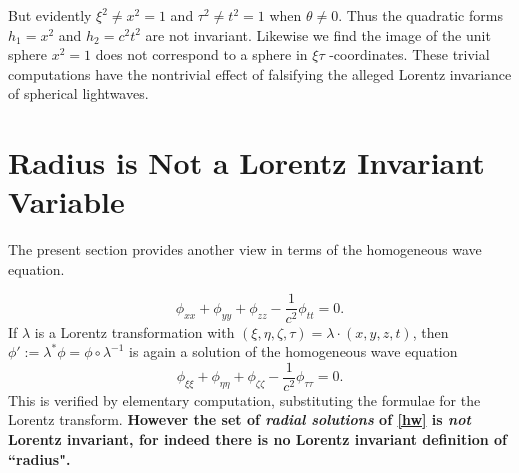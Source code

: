\documentclass[12pt]{amsart}
\theoremstyle{definition}
\theoremstyle{remark}
\newcommand{\del}{\partial}
\begin{document}
But evidently $\xi^2 \neq x^2=1$ and $\tau^2 \neq t^2=1$ when $\theta\neq 0$. Thus the quadratic forms $h_1=x^2$ and $h_2=c^2t^2$ are not invariant. Likewise we find the image of the unit sphere $x^2=1$ does not correspond to a sphere in $\xi \tau$ -coordinates. These trivial computations have the nontrivial effect of falsifying the alleged Lorentz invariance of spherical lightwaves.




\section{Radius is Not a Lorentz Invariant Variable}\label{wes}
The present section provides another view in terms of the homogeneous wave equation.
 
\begin{equation} \label{hw}
\phi_{xx}+\phi_{yy}+\phi_{zz}-\frac{1}{c^2}\phi_{tt}=0.
\end{equation} 
If $\lambda$ is a Lorentz transformation with $(\xi, \eta, \zeta, \tau)=\lambda \cdot (x,y,z,t)$, then $\phi':=\lambda^*\phi=\phi\circ\lambda^{-1}$ is again a solution of the homogeneous wave equation $$\phi_{\xi \xi}+\phi_{\eta \eta}+\phi_{\zeta \zeta}-\frac{1}{c^2}\phi_{\tau \tau}=0.$$ This is verified by elementary computation, substituting the formulae for the Lorentz transform. \textbf{However the set of \emph{radial solutions} of \eqref{hw} is \emph{not} Lorentz invariant, for indeed there is no Lorentz invariant definition of ``radius".} 
\end{document}
